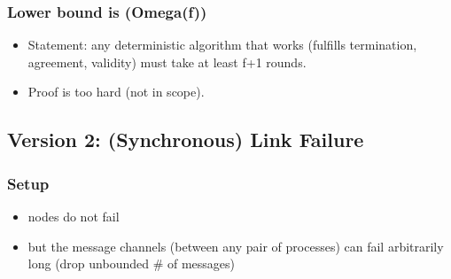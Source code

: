 \documentclass[11pt]{article}
\begin{document}
\subsubsection{Lower bound is (Omega(f))}
\label{sec:org779cd2c}
\begin{itemize}
  \item Statement: any deterministic algorithm that works (fulfills termination,
        agreement, validity) must take at least f+1 rounds.
  \item Proof is too hard (not in scope).
\end{itemize}
\subsection{Version 2: (Synchronous) Link Failure}
\label{sec:orgff2c823}
\subsubsection{Setup}
\label{sec:orgf83acf7}
\begin{itemize}
  \item nodes do not fail
  \item but the message channels (between any pair of processes) can fail arbitrarily
        long (drop unbounded \# of messages)
\end{itemize}
\end{document}
